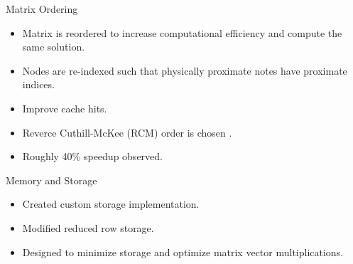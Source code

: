 \begin{frame}{Matrix Ordering}
  \begin{itemize}
    \item Matrix is reordered to increase computational efficiency and compute
      the same solution.
    \item Nodes are re-indexed such that physically proximate notes have
      proximate indices.
    \item Improve cache hits.
    \item Reverce Cuthill-McKee (RCM) order is chosen \cite{rcm}.
    \item Roughly 40\% speedup observed.
  \end{itemize}
  \vspace{-0.25in}
  \begin{figure}
    \centering
    \hspace{0.1in}
    \label{fig:sparsity_pattern}
  \end{figure}
\end{frame}

\begin{frame}{Memory and Storage}
  \begin{itemize}
    \item Created custom \twotable storage implementation.
    \item Modified reduced row storage.
    \item Designed to minimize storage and optimize matrix vector
      multiplications.
  \end{itemize}
\end{frame}

